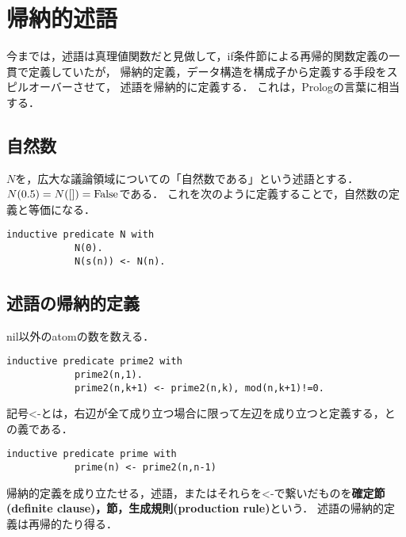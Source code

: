 \documentclass[uplatex, 12pt, dvipdfmx]{jsreport}
\begin{document}
\section{帰納的述語}

今までは，述語は真理値関数だと見做して，if条件節による再帰的関数定義の一貫で定義していたが，
帰納的定義，データ構造を構成子から定義する手段をスピルオーバーさせて，
述語を帰納的に定義する．
これは，Prologの言葉に相当する．

\subsection{自然数}

\begin{definition}
    $N$を，広大な議論領域についての「自然数である」という述語とする．$N(0.5)=N([])=\mathrm{False}$である．
    これを次のように定義することで，自然数の定義と等価になる．
    \begin{lstlisting}[caption=natural number]
        inductive predicate N with
            N(0).
            N(s(n)) <- N(n).
    \end{lstlisting}
\end{definition}

\subsection{述語の帰納的定義}

\begin{example}[k以下での因数を持たない]
    nil以外のatomの数を数える．
    \begin{lstlisting}[caption=prime2]
        inductive predicate prime2 with
            prime2(n,1).
            prime2(n,k+1) <- prime2(n,k), mod(n,k+1)!=0.
    \end{lstlisting}
    記号<-とは，右辺が全て成り立つ場合に限って左辺を成り立つと定義する，との義である．
    \begin{lstlisting}[caption=prime]
        inductive predicate prime with
            prime(n) <- prime2(n,n-1)
    \end{lstlisting}
\end{example}

\begin{definition}[述語の帰納的定義]
    帰納的定義を成り立たせる，述語，またはそれらを<-で繋いだものを\textbf{確定節(definite clause)，節，生成規則(production rule)}という．
    述語の帰納的定義は再帰的たり得る．
\end{definition}
\end{document}
